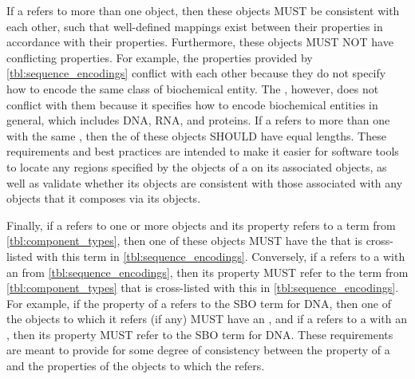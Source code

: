 If a  refers to more than one  object, then these objects MUST be consistent with each other, such that well-defined mappings exist between their  properties in accordance with their  properties. Furthermore, these objects MUST NOT have conflicting  properties. For example, the   properties provided by \ref{tbl:sequence_encodings} conflict with each other because they do not specify how to encode the same class of biochemical entity. The  , however, does not conflict with them because it specifies how to encode biochemical entities in general, which includes DNA, RNA, and proteins. If a  refers to more than one  with the same , then the  of these  objects SHOULD have equal lengths. These requirements and best practices are intended to make it easier for software tools to locate any regions specified by the  objects of a  on its associated  objects, as well as validate whether its  objects are consistent with those associated with any  objects that it composes via its  objects. 

Finally, if a  refers to one or more  objects and its  property refers to a term from \ref{tbl:component_types}, then one of these  objects MUST have the  that is cross-listed with this term in \ref{tbl:sequence_encodings}.
Conversely, if a  refers to a  with an  from \ref{tbl:sequence_encodings}, then its  property MUST refer to the term from \ref{tbl:component_types} that is cross-listed with this  in \ref{tbl:sequence_encodings}.
For example, if the  property of a  refers to the SBO term for DNA, then one of the  objects to which it refers (if any) MUST have an  , and if a  refers to a  with an  , then its  property MUST refer to the SBO term for DNA. These requirements are meant to provide for some degree of consistency between the  property of a  and the  properties of the  objects to which the  refers.

